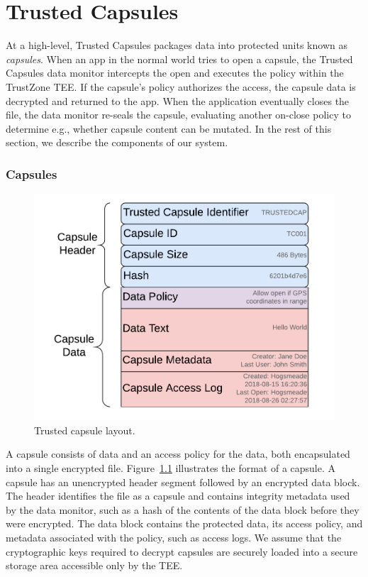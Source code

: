 \chapter{Trusted Capsules}
\label{ch:trustedcapsules}
At a high-level, Trusted Capsules packages data into protected units known as
{\em capsules}. When an app in the normal world tries to open a capsule, the
Trusted Capsules data monitor intercepts the open and executes the policy within
the TrustZone TEE. If the capsule's policy authorizes the access, the capsule
data is decrypted and returned to the app. When the application eventually closes the file,
the data monitor re-seals the capsule, evaluating another on-close policy
to determine e.g., whether capsule content can be mutated. In the rest of this section,
we describe the components of our system.

\subsection{Capsules}

\begin{figure}
  \centering
  \includegraphics[width=\columnwidth]{fig/Fig2_Trusted_Capusle_Layout.pdf}
  \caption{Trusted capsule layout.}
  \label{fig:trustedcapsulelayout}
\end{figure}

A capsule consists of data and an access policy for the data, both encapsulated
into a single encrypted file. Figure~\ref{fig:trustedcapsulelayout} illustrates
the format of a capsule. A capsule has an unencrypted header segment followed by an
encrypted data block. The header identifies the file as a capsule and contains
integrity metadata used by the data monitor, such as a hash of the contents of
the data block before they were encrypted. The data block contains the protected
data, its access policy, and metadata associated with the policy, such as access
logs. We assume that the cryptographic keys required to decrypt capsules are
securely loaded into a secure storage area accessible only by the TEE.
%

